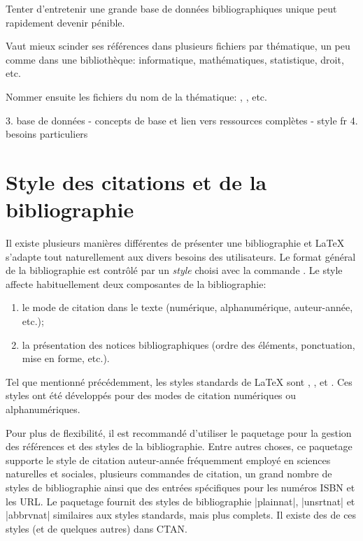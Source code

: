 \begin{conseil}
  Tenter d'entretenir une grande base de données bibliographiques
  unique peut rapidement devenir pénible.

  Vaut mieux scinder ses références dans plusieurs fichiers par
  thématique, un peu comme dans une bibliothèque: informatique,
  mathématiques, statistique, droit, etc.

  Nommer ensuite les fichiers du nom de la thématique:
  , , etc.
\end{conseil}

3. base de données
   - concepts de base et lien vers ressources complètes
   - style fr
4. besoins particuliers



\section{Style des citations et de la bibliographie}
\label{sec:bibliographie:style}

Il existe plusieurs manières différentes de présenter une
bibliographie et {\LaTeX} s'adapte tout naturellement aux divers
besoins des utilisateurs. Le format général de la bibliographie est
contrôlé par un \emph{style} choisi avec la commande
\cmd{}. Le style affecte habituellement deux
composantes de la bibliographie:
\begin{enumerate}
\item le mode de citation dans le texte (numérique, alphanumérique,
  auteur-année, etc.);
\item la présentation des notices bibliographiques (ordre des
  éléments, ponctuation, mise en forme, etc.).
\end{enumerate}

Tel que mentionné précédemment, les styles standards de {\LaTeX} sont
, ,  et . Ces styles
ont été développés pour des modes de citation numériques ou
alphanumériques.

Pour plus de flexibilité, il est recommandé d'utiliser le paquetage
 pour la gestion des références et des styles de la
bibliographie. Entre autres choses, ce paquetage supporte le style de
citation auteur-année fréquemment employé en sciences naturelles et
sociales, plusieurs commandes de citation, un grand nombre de styles
de bibliographie ainsi que des entrées spécifiques pour les numéros
ISBN et les URL. Le paquetage fournit des styles de bibliographie
|plainnat|, |unsrtnat| et |abbrvnat| similaires aux styles standards,
mais plus complets. Il existe des %
de ces styles (et de quelques autres) dans CTAN.

